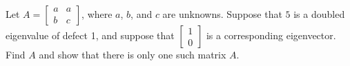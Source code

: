 \documentclass{ximera}
\begin{document}
\begin{exercise}%
    Let $A =
    \left[ 
        \begin{smallmatrix}
            a & a \\
            b & c
        \end{smallmatrix}
    \right]$, 
    where $a$, $b$, and $c$ are unknowns. Suppose that $5$ is a doubled eigenvalue of defect 1, and suppose that
    $\left[ 
        \begin{smallmatrix}
            1 \\ 
            0
        \end{smallmatrix}
    \right]$ 
    is a corresponding eigenvector.  Find $A$ and show that there is only one such matrix $A$.
\end{exercise}
\end{document}
